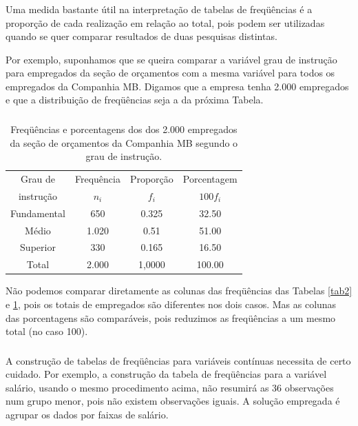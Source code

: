 \documentclass[14pt,aspectratio=1610]{beamer}
\begin{document}
\begin{frame}{}
\frametitle{}
\begin{block}{}
\justifying
Uma medida bastante útil na interpretação de tabelas de freqüências é a proporção de
cada realização em relação ao total, pois podem ser utilizadas quando se quer comparar
resultados de duas pesquisas distintas.
\end{block}
\pause
\begin{block}{}
\justifying
Por exemplo, suponhamos que se queira comparar a variável grau de instrução para empregados da seção de orçamentos com a mesma variável para todos os empregados da Companhia MB. Digamos que a empresa tenha 2.000 empregados e que a distribuição de freqüências seja a da próxima Tabela.
\end{block}
\end{frame}

\begin{frame}{}
\frametitle{}
\begin{block}{}
\justifying
\begin{table}[H]
\caption{Freqüências e porcentagens dos dos 2.000 empregados da seção de orçamentos da Companhia MB segundo o grau de instrução.}
\label{tab3}
\begin{tabular}{c|c|c|c}
\hline
Grau de   &Frequência&Proporção&Porcentagem\\
instrução &$n_{i}$   &$f_{i}$  &$100f_{i}$ \\
\hline
Fundamental&650      &0.325    &32.50      \\
Médio      &1.020    &0.51     &51.00      \\
Superior   & 330     &0.165    &16.50      \\
\hline
Total      &2.000    &1,0000   &100.00     \\
\hline
\end{tabular}
\end{table}
Não podemos comparar diretamente as colunas das freqüências das Tabelas \ref{tab2} e \ref{tab3}, pois os totais de empregados são diferentes nos dois casos. Mas as colunas das porcentagens são comparáveis, pois reduzimos as freqüências a um mesmo total (no caso 100).
\end{block}
\end{frame}

\begin{frame}{}
\frametitle{}
\begin{block}{}
\justifying
A construção de tabelas de freqüências para variáveis contínuas necessita de certo
cuidado. Por exemplo, a construção da tabela de freqüências para a variável salário,
usando o mesmo procedimento acima, não resumirá as 36 observações num grupo
menor, pois não existem observações iguais. A solução empregada é agrupar os dados
por faixas de salário.
\end{block}
\end{frame}
\end{document}
